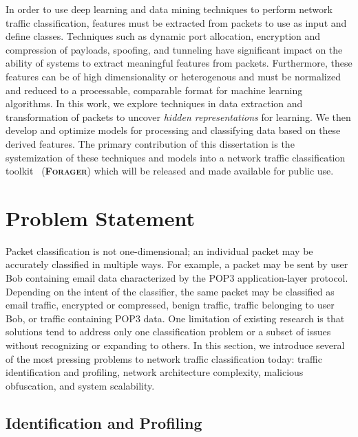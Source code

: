 In order to use deep learning and data mining techniques to perform network traffic classification, features must be extracted from packets to use as input and define classes. Techniques such as dynamic port allocation, encryption and compression of payloads, spoofing, and tunneling have significant impact on the ability of systems to extract meaningful features from packets. Furthermore, these features can be of high dimensionality or heterogenous and must be normalized and reduced to a processable, comparable format for machine learning algorithms. In this work, we explore techniques in data extraction and transformation of packets to uncover \textit{hidden representations} for learning. We then develop and optimize models for processing and classifying data based on these derived features. The primary contribution of this dissertation is the systemization of these techniques and models into a network traffic classification toolkit ~\textsc{(\textbf{Forager})} which will be released and made available for public use.

\section{Problem Statement}

Packet classification is not one-dimensional; an individual packet may be accurately classified in multiple ways. For example, a packet may be sent by user Bob containing email data characterized by the POP3 application-layer protocol. Depending on the intent of the classifier, the same packet may be classified as email traffic, encrypted or compressed, benign traffic, traffic belonging to user Bob, or traffic containing POP3 data. One limitation of existing research is that solutions tend to address only one classification problem or a subset of issues without recognizing or expanding to others. In this section, we introduce several of the most pressing problems to network traffic classification today: traffic identification and profiling, network architecture complexity, malicious obfuscation, and system scalability.

\subsection{Identification and Profiling}

